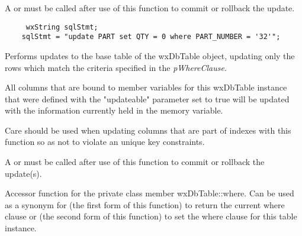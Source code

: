 

A  or
 must be called after use of
this function to commit or rollback the update.


\begin{verbatim}
	 wxString sqlStmt;
    sqlStmt = "update PART set QTY = 0 where PART_NUMBER = '32'";
\end{verbatim}

\label{wxdbtableupdatewhere}


Performs updates to the base table of the wxDbTable object, updating only the
rows which match the criteria specified in the {\it pWhereClause}.

All columns that are bound to member variables for this wxDbTable instance
that were defined with the "updateable" parameter set to true will be updated
with the information currently held in the memory variable.




Care should be used when updating columns that are part of indexes with
this function so as not to violate an unique key constraints.

A  or
 must be called after use of
this function to commit or rollback the update(s).

\label{wxdbtablewhere}



Accessor function for the private class member wxDbTable::where.  Can be used
as a synonym for 
(the first form of this function) to return the current where clause or
 (the second form
of this function) to set the where clause for this table instance.

